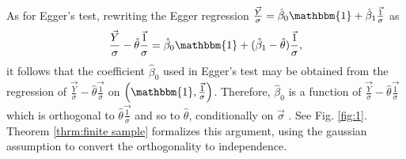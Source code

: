 \documentclass[12pt]{article}
\newcommand{\sigmavec}{\vec{\frac{1}{\sigma}}}
\newcommand{\yvec}{\vec{\frac{\y}{\sigma}}}
\newcommand{\y}{Y}
\begin{document}
As for Egger's test, rewriting the Egger regression
$\yvec=\hat\beta_0\mathbbm{1}+\hat\beta_1\sigmavec%
$ as
$$\yvec-\hat\theta\sigmavec=\hat\beta_0\mathbbm{1}+(\hat\beta_1-\hat\theta)\sigmavec,$$
it follows that the coefficient $\hat\beta_0$ used in Egger's test may
be obtained from the regression of $\yvec-\hat\theta\sigmavec$ on
$\left(\mathbbm{1},\sigmavec\right)$. Therefore, $\hat\beta_0$ is a
function of $\yvec-\hat\theta\sigmavec$ which is orthogonal to
$\hat\theta\sigmavec$ and so to $\hat\theta$, conditionally on
$\vec\sigma$%
. See Fig. \ref{fig:1}. Theorem \ref{thrm:finite sample} formalizes
this argument, using the gaussian assumption to convert the
orthogonality to independence.
%
\end{document}
